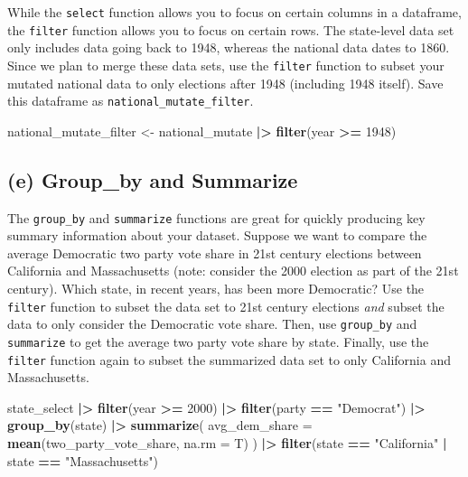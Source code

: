 \documentclass[
]{article}
\newenvironment{Shaded}{\begin{snugshade}}{\end{snugshade}}
\newcommand{\AttributeTok}[1]{\textcolor[rgb]{0.13,0.29,0.53}{#1}}
\newcommand{\DecValTok}[1]{\textcolor[rgb]{0.00,0.00,0.81}{#1}}
\newcommand{\FunctionTok}[1]{\textcolor[rgb]{0.13,0.29,0.53}{\textbf{#1}}}
\newcommand{\NormalTok}[1]{#1}
\newcommand{\OtherTok}[1]{\textcolor[rgb]{0.56,0.35,0.01}{#1}}
\newcommand{\SpecialCharTok}[1]{\textcolor[rgb]{0.81,0.36,0.00}{\textbf{#1}}}
\newcommand{\StringTok}[1]{\textcolor[rgb]{0.31,0.60,0.02}{#1}}
\begin{document}
While the \texttt{select} function allows you to focus on certain
columns in a dataframe, the \texttt{filter} function allows you to focus
on certain rows. The state-level data set only includes data going back
to 1948, whereas the national data dates to 1860. Since we plan to merge
these data sets, use the \texttt{filter} function to subset your mutated
national data to only elections after 1948 (including 1948 itself). Save
this dataframe as \texttt{national\_mutate\_filter}.

\begin{Shaded}
\begin{Highlighting}[]
\NormalTok{national\_mutate\_filter }\OtherTok{\textless{}{-}}\NormalTok{ national\_mutate }\SpecialCharTok{|\textgreater{}}
  \FunctionTok{filter}\NormalTok{(year }\SpecialCharTok{\textgreater{}=} \DecValTok{1948}\NormalTok{)}
\end{Highlighting}
\end{Shaded}

\subsection{(e) Group\_by and Summarize}\label{e-group_by-and-summarize}

The \texttt{group\_by} and \texttt{summarize} functions are great for
quickly producing key summary information about your dataset. Suppose we
want to compare the average Democratic two party vote share in 21st
century elections between California and Massachusetts (note: consider
the 2000 election as part of the 21st century). Which state, in recent
years, has been more Democratic? Use the \texttt{filter} function to
subset the data set to 21st century elections \emph{and} subset the data
to only consider the Democratic vote share. Then, use \texttt{group\_by}
and \texttt{summarize} to get the average two party vote share by state.
Finally, use the \texttt{filter} function again to subset the summarized
data set to only California and Massachusetts.

\begin{Shaded}
\begin{Highlighting}[]
\NormalTok{state\_select }\SpecialCharTok{|\textgreater{}}
  \FunctionTok{filter}\NormalTok{(year }\SpecialCharTok{\textgreater{}=} \DecValTok{2000}\NormalTok{) }\SpecialCharTok{|\textgreater{}}
  \FunctionTok{filter}\NormalTok{(party }\SpecialCharTok{==} \StringTok{"Democrat"}\NormalTok{) }\SpecialCharTok{|\textgreater{}}
  \FunctionTok{group\_by}\NormalTok{(state) }\SpecialCharTok{|\textgreater{}}
  \FunctionTok{summarize}\NormalTok{(}
    \AttributeTok{avg\_dem\_share =} \FunctionTok{mean}\NormalTok{(two\_party\_vote\_share, }\AttributeTok{na.rm =}\NormalTok{ T)}
\NormalTok{  ) }\SpecialCharTok{|\textgreater{}}
  \FunctionTok{filter}\NormalTok{(state }\SpecialCharTok{==} \StringTok{"California"} \SpecialCharTok{|}\NormalTok{ state }\SpecialCharTok{==} \StringTok{"Massachusetts"}\NormalTok{)}
\end{Highlighting}
\end{Shaded}
\end{document}
